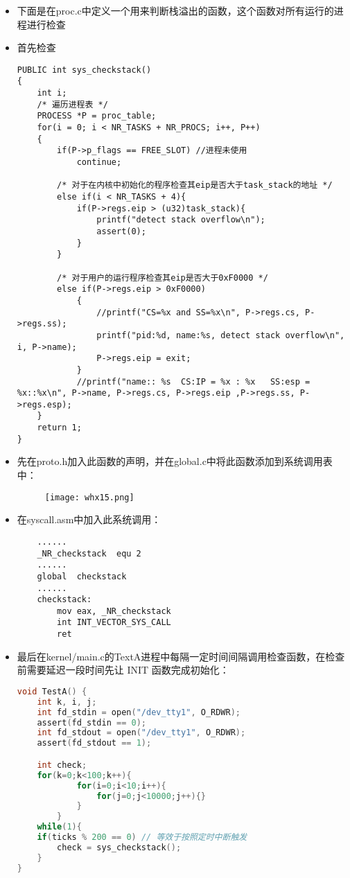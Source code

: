\documentclass{whureport}
\begin{document}
\begin{itemize}
	\item 下面是在proc.c中定义一个用来判断栈溢出的函数，这个函数对所有运行的进程进行检查
	\item 首先检查
	\begin{lstlisting}
PUBLIC int sys_checkstack()
{
	int i;
	/* 遍历进程表 */
	PROCESS *P = proc_table;
	for(i = 0; i < NR_TASKS + NR_PROCS; i++, P++)
	{
		if(P->p_flags == FREE_SLOT) //进程未使用
			continue;
		
		/* 对于在内核中初始化的程序检查其eip是否大于task_stack的地址 */
		else if(i < NR_TASKS + 4){
			if(P->regs.eip > (u32)task_stack){
				printf("detect stack overflow\n");
				assert(0);
			}
		}
		
		/* 对于用户的运行程序检查其eip是否大于0xF0000 */
		else if(P->regs.eip > 0xF0000)
			{
				//printf("CS=%x and SS=%x\n", P->regs.cs, P->regs.ss);
				printf("pid:%d, name:%s, detect stack overflow\n", i, P->name);
				P->regs.eip = exit;
			}
			//printf("name:: %s  CS:IP = %x : %x   SS:esp = %x::%x\n", P->name, P->regs.cs, P->regs.eip ,P->regs.ss, P->regs.esp);
	}
	return 1;
}	\end{lstlisting}
	\item 先在proto.h加入此函数的声明，并在global.c中将此函数添加到系统调用表中：
	\begin{figure}[H]
		\centering
		\texttt{[image: whx15.png]}
	\end{figure}
	
	\item 在syscall.asm中加入此系统调用：
	\begin{lstlisting}
	......
	_NR_checkstack	equ	2
	......
	global	checkstack
	......
	checkstack:
		mov eax, _NR_checkstack
		int INT_VECTOR_SYS_CALL
		ret
	\end{lstlisting}
	
	\item 最后在kernel/main.c的TextA进程中每隔一定时间间隔调用检查函数，在检查前需要延迟一段时间先让 INIT 函数完成初始化：
	\begin{lstlisting}[language=c]
	void TestA() {
    int k, i, j;
    int fd_stdin = open("/dev_tty1", O_RDWR); 
    assert(fd_stdin == 0);
    int fd_stdout = open("/dev_tty1", O_RDWR);
    assert(fd_stdout == 1);

    int check;
    for(k=0;k<100;k++){
            for(i=0;i<10;i++){
                for(j=0;j<10000;j++){}
            }
        }
    while(1){
    if(ticks % 200 == 0) // 等效于按照定时中断触发
        check = sys_checkstack();
    }   
}
	\end{lstlisting}
\end{itemize}
\end{document}
